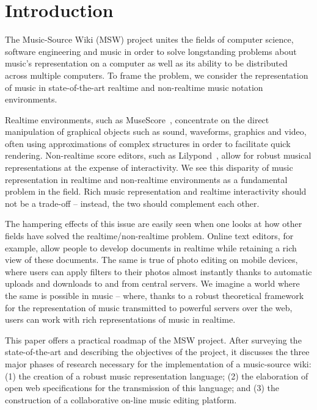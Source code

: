 \documentclass{article}
\title{\papertitle}
\begin{document}
%
\capstartfalse
\maketitle
\capstarttrue
%
\begin{abstract}
The abstract should be placed at the top left column and should contain about 150–-200 words.
\end{abstract}
%

\section{Introduction}\label{sec:introduction}
The Music-Source Wiki (MSW) project unites the fields of computer science, software
engineering and music in order to solve longstanding problems about music’s
representation on a computer as well as its ability to be distributed across
multiple computers. To frame the problem, we consider the representation of
music in state-of-the-art real\-time and non-real\-time music notation
environments.

Realtime environments, such as MuseScore~\cite{musescore}, concentrate on
the direct manipulation of graphical objects such as sound, waveforms,
graphics and video, often using approximations of complex structures in
order to facilitate quick rendering. Non-real\-time score editors, such as
Lilypond~\cite{lilypond06}, allow for robust musical representations at the expense of
interactivity. We see this disparity of music representation in real\-time and
non-real\-time environments as a fundamental problem in the field. Rich music
representation and real\-time interactivity should not be a trade-off –
instead, the two should complement each other.

The hampering effects of this issue are easily seen when one looks at how
other fields have solved the real\-time/non-real\-time problem. Online text
editors, for example, allow people to develop documents in real\-time while
retaining a rich view of these documents. The same is true of photo editing
on mobile devices, where users can apply filters to their photos almost
instantly thanks to automatic uploads and downloads to and from central
servers. We imagine a world where the same is possible in music – where,
thanks to a robust theoretical framework for the representation of music
transmitted to powerful servers over the web, users can work with rich
representations of music in real\-time.

This paper offers a practical roadmap
of the MSW project. After surveying the
state-of-the-art and describing the objectives of the project,
it discusses the three major phases of research necessary
for the implementation of a music-source wiki: (1) the creation of a robust
music representation language; (2) the elaboration of open web
specifications for the transmission of this language; and (3) the
construction of a collaborative on-line music editing platform.
\end{document}
